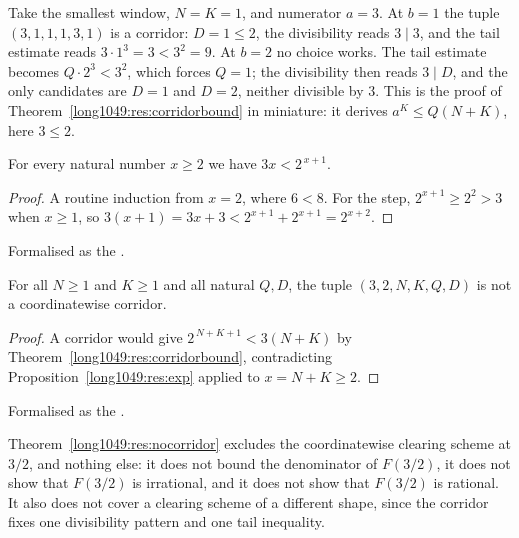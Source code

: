 \begin{example}\label{long1049:ex:corridor}
Take the smallest window, $N=K=1$, and numerator $a=3$.  At $b=1$ the tuple
$(3,1,1,1,3,1)$ is a corridor: $D=1\le2$, the divisibility reads $3\mid3$, and
the tail estimate reads $3\cdot1^{3}=3<3^{2}=9$.  At $b=2$ no choice works.  The
tail estimate becomes $Q\cdot2^{3}<3^{2}$, which forces $Q=1$; the divisibility
then reads $3\mid D$, and the only candidates are $D=1$ and $D=2$, neither
divisible by $3$.  This is the proof of
Theorem~\ref{long1049:res:corridorbound} in miniature: it derives $a^{K}\le Q(N+K)$,
here $3\le2$.
\end{example}

\begin{proposition}\label{long1049:res:exp}
For every natural number $x\ge2$ we have $3x<2^{\,x+1}$.
\end{proposition}

\begin{proof}
A routine induction from $x=2$, where $6<8$.  For the step, $2^{x+1}\ge2^{2}>3$ when
$x\ge1$, so $3(x+1)=3x+3<2^{x+1}+2^{x+1}=2^{x+2}$.
\end{proof}

\noindent Formalised as the
.

\begin{theorem}\label{long1049:res:nocorridor}
For all $N\ge1$ and $K\ge1$ and all natural $Q,D$, the tuple
$(3,2,N,K,Q,D)$ is not a coordinatewise corridor.
\end{theorem}

\begin{proof}
A corridor would give $2^{\,N+K+1}<3(N+K)$ by
Theorem~\ref{long1049:res:corridorbound}, contradicting Proposition~\ref{long1049:res:exp}
applied to $x=N+K\ge2$.
\end{proof}

\noindent Formalised as the
.

Theorem~\ref{long1049:res:nocorridor} excludes the coordinatewise clearing scheme at
$3/2$, and nothing else: it does not bound the denominator of $F(3/2)$, it does
not show that $F(3/2)$ is irrational, and it does not show that $F(3/2)$ is
rational.  It also does not cover a clearing scheme of a different shape, since
the corridor fixes one divisibility pattern and one tail inequality.

